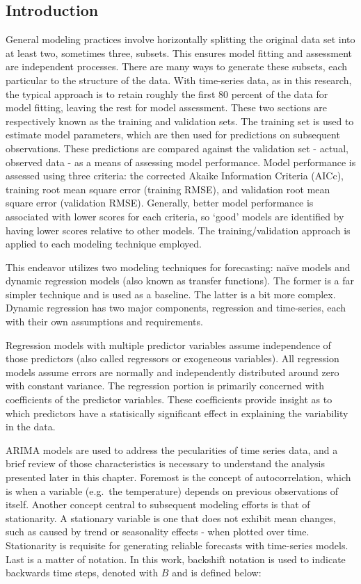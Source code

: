 \documentclass[12pt,letterpaper,toc=flat,oneside]{report}
\theoremstyle{definition}
\theoremstyle{definition}
\theoremstyle{definition}
\theoremstyle{remark}
\begin{document}
\hypertarget{introduction-2}{%
\subsection{Introduction}\label{introduction-2}}

General modeling practices involve horizontally splitting the original
data set into at least two, sometimes three, subsets. This ensures model
fitting and assessment are independent processes. There are many ways to
generate these subsets, each particular to the structure of the data.
With time-series data, as in this research, the typical approach is to
retain roughly the first 80 percent of the data for model fitting,
leaving the rest for model assessment. These two sections are
respectively known as the training and validation sets. The training set
is used to estimate model parameters, which are then used for
predictions on subsequent observations. These predictions are compared
against the validation set - actual, observed data - as a means of
assessing model performance. Model performance is assessed using three
criteria: the corrected Akaike Information Criteria (AICc), training
root mean square error (training RMSE), and validation root mean square
error (validation RMSE). Generally, better model performance is
associated with lower scores for each criteria, so `good' models are
identified by having lower scores relative to other models. The
training/validation approach is applied to each modeling technique
employed.

This endeavor utilizes two modeling techniques for forecasting: naïve
models and dynamic regression models (also known as transfer functions).
The former is a far simpler technique and is used as a baseline. The
latter is a bit more complex. Dynamic regression has two major
components, regression and time-series, each with their own assumptions
and requirements.

Regression models with multiple predictor variables assume independence
of those predictors (also called regressors or exogeneous variables).
All regression models assume errors are normally and independently
distributed around zero with constant variance. The regression portion
is primarily concerned with coefficients of the predictor variables.
These coefficients provide insight as to which predictors have a
statisically significant effect in explaining the variability in the
data.

ARIMA models are used to address the pecularities of time series data,
and a brief review of those characteristics is necessary to understand
the analysis presented later in this chapter. Foremost is the concept of
autocorrelation, which is when a variable (e.g.~the temperature) depends
on previous observations of itself. Another concept central to
subsequent modeling efforts is that of stationarity. A stationary
variable is one that does not exhibit mean changes, such as caused by
trend or seasonality effects - when plotted over time. Stationarity is
requisite for generating reliable forecasts with time-series models.
Last is a matter of notation. In this work, backshift notation is used
to indicate backwards time steps, denoted with \(B\) and is defined
below:
\end{document}
